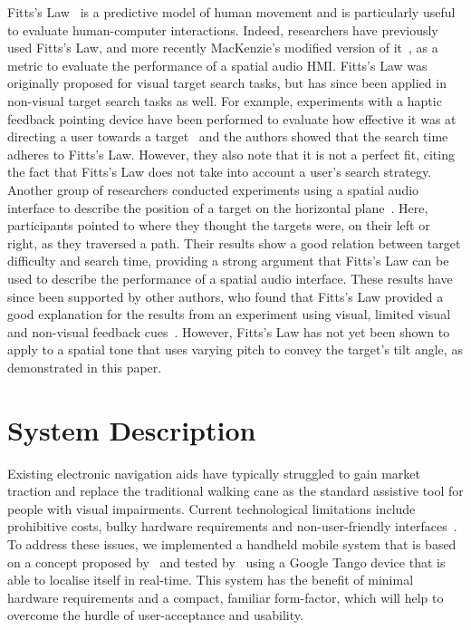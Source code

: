 \documentclass[acmsmall]{acmart}
\begin{document}
Fitts's Law~\citep{fitts1954information} is a predictive model of human movement and is particularly useful to evaluate human-computer interactions.
Indeed, researchers have previously used Fitts's Law, and more recently MacKenzie's modified version of it~\citep{mackenzie1992fitts}, as a metric to evaluate the performance of a spatial audio HMI\@.
Fitts's Law was originally proposed for visual target search tasks, but has since been applied in non-visual target search tasks as well.
For example, experiments with a haptic feedback pointing device have been performed to evaluate how effective it was at directing a user towards a target~\citep{ahmaniemi2009augmented} and the authors showed that the search time adheres to Fitts's Law.
However, they also note that it is not a perfect fit, citing the fact that Fitts's Law does not take into account a user's search strategy.
Another group of researchers conducted experiments using a spatial audio interface to describe the position of a target on the horizontal plane~\citep{marentakis2006effects}.
Here, participants pointed to where they thought the targets were, on their left or right, as they traversed a path.
Their results show a good relation between target difficulty and search time, providing a strong argument that Fitts's Law can be used to describe the performance of a spatial audio interface.
These results have since been supported by other authors, who found that Fitts's Law provided a good explanation for the results from an experiment using visual, limited visual and non-visual feedback cues~\citep{wu2010fitts}.
However, Fitts's Law has not yet been shown to apply to a spatial tone that uses varying pitch to convey the target's tilt angle, as demonstrated in this paper.

\section{System Description}\label{sec:system-description}

Existing electronic navigation aids have typically struggled to gain market traction and replace the traditional walking cane as the standard assistive tool for people with visual impairments.
Current technological limitations include prohibitive costs, bulky hardware requirements and non-user-friendly interfaces~\citep{golledge2004stated,yusif2016older,arditi2013user}.
To address these issues, we implemented a handheld mobile system that is based on a concept proposed by~\citet{lock2019active} and tested by~\citet{lock2019bone} using a Google Tango device that is able to localise itself in real-time.
This system has the benefit of minimal hardware requirements and a compact, familiar form-factor, which will help to overcome the hurdle of user-acceptance and usability.
\end{document}
